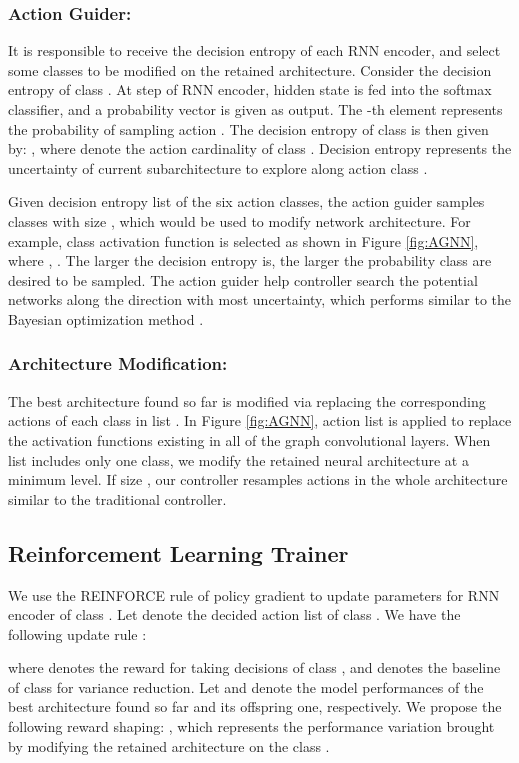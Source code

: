 \documentclass[sigconf]{acmart}
\begin{document}
\subsubsection{\textbf{Action Guider}:} It is responsible to receive the decision entropy of each RNN encoder, and select some classes to be modified on the retained architecture. Consider the decision entropy of class . At step  of RNN encoder, hidden state  is fed into the softmax classifier, and a probability vector  is given as output. 
The -th element  represents the probability of sampling action . The decision entropy of class  is then given by: , where  denote the action cardinality of class . Decision entropy  represents the uncertainty of current subarchitecture to explore along action class .

Given decision entropy list  of the six action classes, the action guider samples classes  with size , which would be used to modify network architecture. For example, class activation function is selected as shown in Figure \ref{fig:AGNN}, where , . The larger the decision entropy  is, the larger the probability class  are desired to be sampled. The action guider help controller search the potential networks along the direction with most uncertainty, which performs similar to the Bayesian optimization method \cite{jin2018auto}. 

\subsubsection{\textbf{Architecture Modification}:} The best architecture found so far is modified via replacing the corresponding actions of each class in list . In Figure \ref{fig:AGNN}, action list  is applied to replace the activation functions existing in all of the  graph convolutional layers. When list  includes only one class, we modify the retained neural architecture at a minimum level. If size , our controller resamples actions in the whole architecture similar to the traditional controller.

\subsection{Reinforcement Learning Trainer}
We use the REINFORCE rule of policy gradient \cite{sutton2000policy} to update parameters  for RNN encoder of class . Let  denote the decided action list of class . 
We have the following update rule \cite{zoph2016neural}:

where  denotes the reward for taking decisions  of class , and  denotes the baseline of class  for variance reduction. Let  and  denote the model performances of the best architecture found so far and its offspring one, respectively. We propose the following reward shaping: , which represents the performance variation brought by modifying the retained architecture on the class . 
\end{document}
